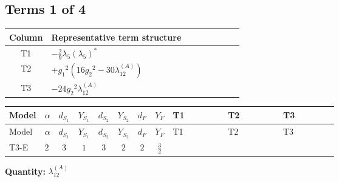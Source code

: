 \documentclass[8pt]{article}
\begin{document}
\begin{landscape}
\subsection*{Terms 1 of 4}
\begin{center}
\begin{tabular}{@{}c >{\raggedright\arraybackslash}p{0.82\linewidth}@{}}
\toprule
Column & Representative term structure \\
\midrule
T1 & \(\displaystyle -\frac{2}{9} {\lambda_5} \left({\lambda_5}\right)^{*}\) \\
\midrule
T2 & \(\displaystyle +{g_1}^2 \left(16 {g_2}^2-30 {\lambda_{12}^{(A)}}\right)\) \\
\midrule
T3 & \(\displaystyle -24 {g_2}^2 {\lambda_{12}^{(A)}}\) \\
\midrule
\bottomrule
\end{tabular}
\end{center}
\smallskip
\tiny
\begin{longtable}{@{}llcccccc >{\raggedright\arraybackslash}p{0.21\linewidth} >{\raggedright\arraybackslash}p{0.21\linewidth} >{\raggedright\arraybackslash}p{0.21\linewidth}@{}}
\toprule
Model & $\alpha$ & $d_{S_1}$ & $Y_{S_1}$ & $d_{S_2}$ & $Y_{S_2}$ & $d_F$ & $Y_F$ & T1 & T2 & T3 \\
\midrule
\endfirsthead
\toprule
Model & $\alpha$ & $d_{S_1}$ & $Y_{S_1}$ & $d_{S_2}$ & $Y_{S_2}$ & $d_F$ & $Y_F$ & T1 & T2 & T3 \\
\midrule
\endhead
T3-E & $2$ & $3$ & $1$ & $3$ & $2$ & $2$ & $\frac{3}{2}$ & \scriptsize\adjustbox{max width=\linewidth}{$\begin{gathered} -\frac{2}{9} {\lambda_5} \left({\lambda_5}\right)^{*}\end{gathered}$} & \scriptsize\adjustbox{max width=\linewidth}{$\begin{gathered} +{g_1}^2 \left(16 {g_2}^2-30 {\lambda_{12}^{(A)}}\right)\end{gathered}$} & \scriptsize\adjustbox{max width=\linewidth}{$\begin{gathered} -24 {g_2}^2 {\lambda_{12}^{(A)}}\end{gathered}$} \\
\midrule
\bottomrule
\end{longtable}
\clearpage
\noindent\textbf{Quantity: }$\lambda_{12}^{(A)}$\par\smallskip

\end{landscape}
\end{document}
